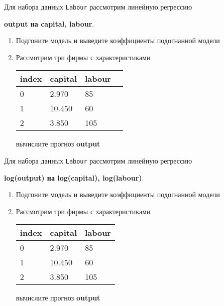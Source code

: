 \begin{exercise}
Для набора данных \texttt{Labour} рассмотрим линейную регрессию 
\begin{center}
	\textbf{output на capital, labour}.
\end{center}
\begin{enumerate}
	\item Подгоните модель и выведите коэффициенты подогнанной модели
	\item Рассмотрим три фирмы с характеристиками
	\begin{center}
		\begin{tabular}{|l||l||l|l|}\hline
			index & capital & labour \\ \hline\hline
			0 & 2.970 & 85 \\
			1 & 10.450 & 60  \\
			2 & 3.850 & 105 \\ \hline
		\end{tabular}
	\end{center}
	вычислите прогноз \textbf{output}
\end{enumerate}
\end{exercise}

\begin{exercise}
Для набора данных \texttt{Labour} рассмотрим линейную регрессию 
\begin{center}
	\textbf{log(output) на log(capital), log(labour)}.
\end{center}
\begin{enumerate}
	\item Подгоните модель и выведите коэффициенты подогнанной модели
	\item Рассмотрим три фирмы с характеристиками
	\begin{center}
		\begin{tabular}{|l||l|l|}\hline
			index & capital & labour \\ \hline\hline
			0 & 2.970 & 85 \\
			1 & 10.450 & 60  \\
			2 & 3.850 & 105 \\ \hline
		\end{tabular}
	\end{center}
	вычислите прогноз \textbf{output}
\end{enumerate}
\end{exercise}

